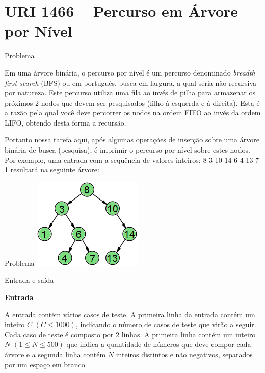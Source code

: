 \section{URI 1466 -- Percurso em Árvore por Nível}

\begin{frame}[fragile]{Problema}

Em uma árvore binária, o percurso por nível é um percurso denominado \textit{breadth first search} (BFS) ou em português, busca em largura, a qual seria não-recursiva por natureza. Este percurso utiliza uma fila ao invés de pilha para armazenar os próximos 2 nodos que devem ser pesquisados (filho à esquerda e à direita). Esta é a razão pela qual você deve percorrer os nodos na ordem FIFO ao invés da ordem LIFO, obtendo desta forma a recursão.

Portanto nossa tarefa aqui, após algumas operações de inserção sobre uma árvore binária de busca (pesquisa), é imprimir o percurso por nível sobre estes nodos. Por exemplo, uma entrada com a sequência de valores inteiros: 8 3 10 14 6 4 13 7 1 resultará na seguinte árvore:

\end{frame}


\begin{frame}[fragile]{Problema}
    \includegraphics[scale=1,center]{UOJ_1466.png}
\end{frame}

\begin{frame}[fragile]{Entrada e saída}

\textbf{Entrada}

A entrada contém vários casos de teste. A primeira linha da entrada contém um inteiro $C$ $(C \leq 1000)$, indicando o número de casos de teste que virão a seguir. Cada caso de teste é composto por 2 linhas. A primeira linha contém um inteiro $N$ $(1 \leq N \leq 500)$ que indica a quantidade de números que deve compor cada árvore e a segunda linha contém $N$ inteiros distintos e não negativos, separados por um espaço em branco.

\end{frame}

